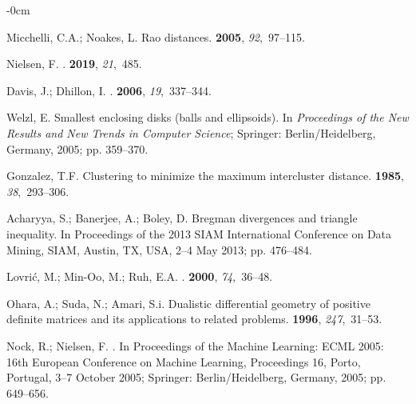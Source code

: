 \documentclass[entropy,article,accept,oneauthor,pdftex,entropy]{Definitions/mdpi}
\begin{document}
\begin{adjustwidth}{-\extralength}{0cm}
\begin{thebibliography}{999}
Micchelli, C.A.; Noakes, L.
\newblock Rao distances.
 {\bf 2005}, {\em 92},~97--115.

Nielsen, F.
.
 {\bf 2019}, {\em 21},~485.

Davis, J.; Dhillon, I.
.
 {\bf 2006},
  {\em 19},~337--344.

Welzl, E.
\newblock Smallest enclosing disks (balls and ellipsoids).
\newblock In \emph{Proceedings of the New Results and New Trends in Computer Science};
  Springer: {Berlin/Heidelberg, Germany,} %
  2005; pp. 359--370.

Gonzalez, T.F.
\newblock Clustering to minimize the maximum intercluster distance.
 {\bf 1985}, {\em 38},~293--306.

Acharyya, S.; Banerjee, A.; Boley, D.
\newblock Bregman divergences and triangle inequality.
\newblock In Proceedings of the 2013 SIAM International
  Conference on Data Mining, SIAM, {Austin, TX, USA, 2--4 May 2013;} pp. 476--484.

Lovri{\'c}, M.; Min-Oo, M.; Ruh, E.A.
.
 {\bf 2000}, {\em 74},~36--48.

Ohara, A.; Suda, N.; Amari, S.i.
\newblock Dualistic differential geometry of positive definite matrices and its
  applications to related problems.
 {\bf 1996}, {\em
  247},~31--53.

Nock, R.; Nielsen, F.
.
\newblock In Proceedings of the Machine Learning: ECML 2005: 16th European
  Conference on Machine Learning, Proceedings 16, Porto, Portugal, 3--7 October 2005;
   Springer: {Berlin/Heidelberg, Germany,} 2005; pp. 649--656.


\end{thebibliography}
\end{adjustwidth}
\end{document}
